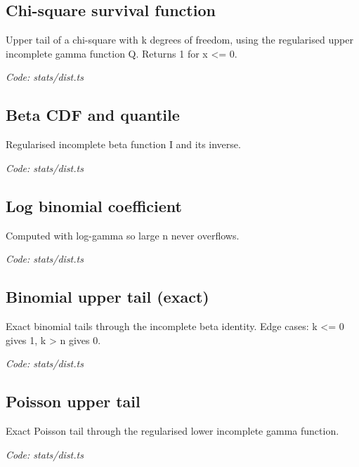 \documentclass[11pt,a4paper]{article}
\newcommand{\where}[1]{\par{\small\itshape\color{mute}Code: #1}\par}
\begin{document}
\subsection*{Chi-square survival function}
\par\smallskip\noindent{}\par\smallskip
Upper tail of a chi-square with k degrees of freedom, using the regularised upper incomplete gamma function Q. Returns 1 for x \textless{}= 0.
\where{stats/dist.ts}

\subsection*{Beta CDF and quantile}
\par\smallskip\noindent{}\par\smallskip
Regularised incomplete beta function I and its inverse.
\where{stats/dist.ts}

\subsection*{Log binomial coefficient}
\par\smallskip\noindent{}\par\smallskip
Computed with log-gamma so large n never overflows.
\where{stats/dist.ts}

\subsection*{Binomial upper tail (exact)}
\par\smallskip\noindent{}\par\smallskip
\par\smallskip\noindent{}\par\smallskip
Exact binomial tails through the incomplete beta identity. Edge cases: k \textless{}= 0 gives 1, k \textgreater{} n gives 0.
\where{stats/dist.ts}

\subsection*{Poisson upper tail}
\par\smallskip\noindent{}\par\smallskip
Exact Poisson tail through the regularised lower incomplete gamma function.
\where{stats/dist.ts}
\end{document}
